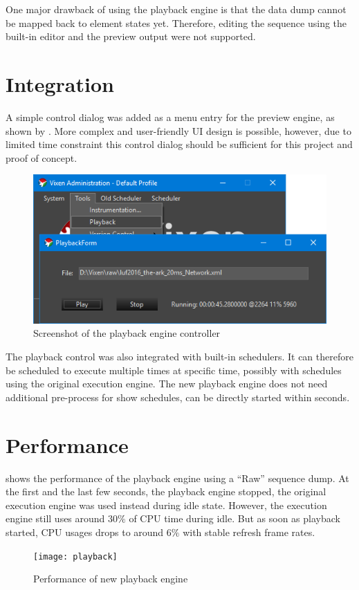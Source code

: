 One major drawback of using the playback engine is that the data dump cannot be mapped back to element states yet. Therefore, editing the sequence using the built-in editor and the preview output were not supported.

\section{Integration}

A simple control dialog was added as a menu entry for the preview engine, as shown by . More complex and user-friendly UI design is possible, however, due to limited time constraint this control dialog should be sufficient for this project and proof of concept.

\begin{figure}[t]
  \centering
  \includegraphics[width=0.8\columnwidth]{Figs/vixen_playback.png}
  \caption{\footnotesize Screenshot of the playback engine controller}
  \label{fig:vixen_playback}
\end{figure}

The playback control was also integrated with built-in schedulers. It can therefore be scheduled to execute multiple times at specific time, possibly with schedules using the original execution engine. The new playback engine does not need additional pre-process for show schedules, can be directly started within seconds.

\section{Performance}

 shows the performance of the playback engine using a ``Raw'' sequence dump. At the first and the last few seconds, the playback engine stopped, the original execution engine was used instead during idle state. However, the execution engine still uses around $30 \%$ of CPU time during idle. But as soon as playback started, CPU usages drops to around $6 \%$ with stable refresh frame rates.

\begin{figure}[t]
  \centering
  \texttt{[image: playback]}
  \caption{\footnotesize Performance of new playback engine}
  \label{fig:playback}
\end{figure}
